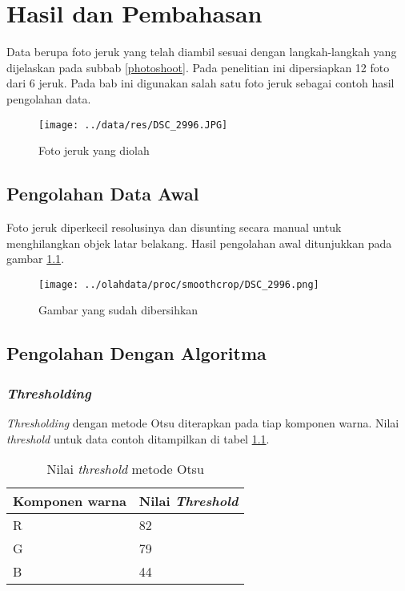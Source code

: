 \documentclass[laporan.tex]{subfiles}
\begin{document}
\chapter{Hasil dan Pembahasan}

Data berupa foto jeruk yang telah diambil sesuai dengan langkah-langkah yang dijelaskan pada subbab \ref{photoshoot}. Pada penelitian ini dipersiapkan 12 foto dari 6 jeruk. Pada bab ini digunakan salah satu foto jeruk sebagai contoh hasil pengolahan data.

\begin{figure}[h]
\centering
\texttt{[image: ../data/res/DSC\_2996.JPG]}
\caption{Foto jeruk yang diolah}
\end{figure}

\section{Pengolahan Data Awal}

Foto jeruk diperkecil resolusinya dan disunting secara manual untuk menghilangkan objek latar belakang. Hasil pengolahan awal ditunjukkan pada gambar \ref{fig:imgedited}.

\begin{figure}[h!]
\centering
\texttt{[image: ../olahdata/proc/smoothcrop/DSC\_2996.png]}
\caption{Gambar yang sudah dibersihkan}
\label{fig:imgedited}
\end{figure}

\section{Pengolahan Dengan Algoritma}

\subsection{\emph{Thresholding}}

\emph{Thresholding} dengan metode Otsu diterapkan pada tiap komponen warna. Nilai \emph{threshold} untuk data contoh ditampilkan di tabel \ref{table:threshval}.

\begin{table}[h]
\centering
\begin{tabular}{|l|l|}
\hline
Komponen warna & Nilai \emph{Threshold} \\
\hline
R & 82 \\
G & 79 \\
B & 44 \\
\hline
\end{tabular}
\caption{Nilai \emph{threshold} metode Otsu}
\label{table:threshval}
\end{table}
\end{document}
